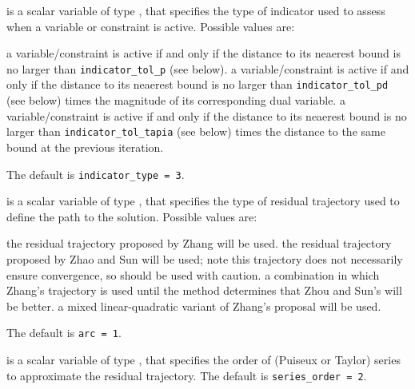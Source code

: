 \begin{description}

 is a scalar variable of type \integer,
that specifies the type of indicator used to assess when a variable or
constraint is active.
Possible values are:

\begin{description}
 a variable/constraint is active if and only if the distance
to its neaerest bound is no larger than {\tt indicator\-\_tol\_p} (see below).
 a variable/constraint is active if and only if the distance
to its neaerest bound is no larger than {\tt indicator\-\_tol\_pd}
(see below) times the magnitude of its corresponding dual variable.
 a variable/constraint is active if and only if the distance
to its neaerest bound is no larger than {\tt indicator\-\_tol\_tapia}
(see below) times the distance to the same bound at the previous iteration.
\end{description}
The default is {\tt indicator\_type = 3}.

 is a scalar variable of type \integer,
that specifies the type of residual trajectory used to define the path
to the solution.
Possible values are:

\begin{description}
 the residual trajectory proposed by Zhang will be used.
 the residual trajectory proposed by Zhao and Sun will be used; note
this trajectory does not necessarily ensure convergence, so should be used
with caution.
 a combination in which Zhang's trajectory is used until the
method determines that Zhou and Sun's will be better.
 a mixed linear-quadratic variant of Zhang's proposal will be used.
\end{description}
The default is {\tt arc = 1}.

 is a scalar variable of type \integer, that
specifies the order of (Puiseux or Taylor) series to approximate the
residual trajectory. The default is {\tt series\_order = 2}.


\end{description}
